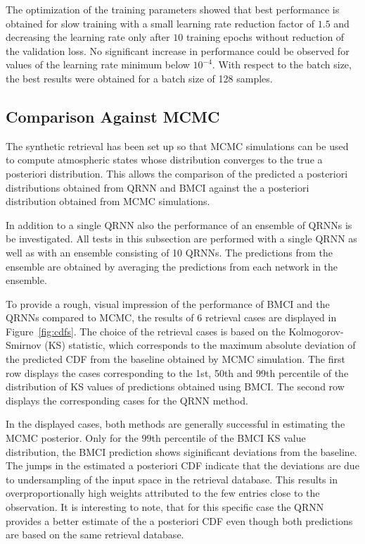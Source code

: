 \documentclass[journal abbreviation, manuscript]{copernicus}
\begin{document}
   The optimization of the training parameters showed that best performance is
   obtained for slow training with a small learning rate reduction factor of
   $1.5$ and decreasing the learning rate only after $10$ training epochs
   without reduction of the validation loss. No significant increase in
   performance could be observed for values of the learning rate minimum below
   $10^{-4}$. With respect to the batch size, the best results were obtained for
   a batch size of 128 samples.

\subsection{Comparison Against MCMC}

  The synthetic retrieval has been set up so that MCMC simulations can be used
  to compute atmospheric states whose distribution converges to the true a
  posteriori distribution. This allows the comparison of the predicted a
  posteriori distributions obtained from QRNN and BMCI against the a posteriori
  distribution obtained from MCMC simulations.

  In addition to a single QRNN also the performance of an ensemble of QRNNs is
  be investigated. All tests in this subsection are performed with a single QRNN
  as well as with an ensemble consisting of 10 QRNNs. The predictions from the
  ensemble are obtained by averaging the predictions from each network in the
  ensemble.

  To provide a rough, visual impression of the performance of BMCI and the QRNNs
  compared to MCMC, the results of 6 retrieval cases are displayed in
  Figure~\ref{fig:cdfs}. The choice of the retrieval cases is based on the
  Kolmogorov-Smirnov (KS) statistic, which corresponds to the maximum absolute
  deviation of the predicted CDF from the baseline obtained by MCMC
  simulation. The first row displays the cases corresponding to the 1st, 50th
  and 99th percentile of the distribution of KS values of predictions obtained
  using BMCI. The second row displays the corresponding cases for the QRNN
  method.

  In the displayed cases, both methods are generally successful in estimating the
  MCMC posterior. Only for the $99$th percentile of the BMCI KS value distribution,
  the BMCI prediction shows siginificant deviations from the baseline. The jumps
  in the estimated a posteriori CDF  indicate that the deviations are due to
  undersampling of the input space in the retrieval database. This results in 
  overproportionally high weights attributed to the few entries close to the
  observation. It is interesting to note, that for this specific case the QRNN
  provides a better estimate of the a posteriori CDF even though both
  predictions are based on the same retrieval database.
\end{document}
